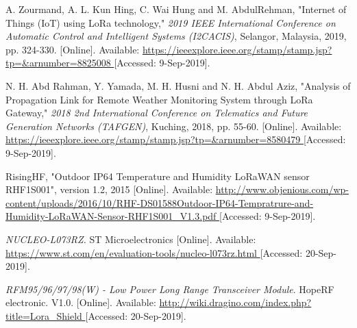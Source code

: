 \begin{thebibliography}{9}

A. Zourmand, A. L. Kun Hing, C. Wai Hung and M. AbdulRehman, "Internet of Things (IoT) using LoRa technology," \textit{2019 IEEE International Conference on Automatic Control and Intelligent Systems (I2CACIS)}, Selangor, Malaysia, 2019, pp. 324-330.
[Online]. Available:
\url{
https://ieeexplore.ieee.org/stamp/stamp.jsp?tp=&arnumber=8825008
}
[Accessed: 9-Sep-2019].


N. H. Abd Rahman, Y. Yamada, M. H. Husni and N. H. Abdul Aziz, "Analysis of Propagation Link for Remote Weather Monitoring System through LoRa Gateway," \textit{2018 2nd International Conference on Telematics and Future Generation Networks (TAFGEN)}, Kuching, 2018, pp. 55-60.
[Online]. Available:
\url{
https://ieeexplore.ieee.org/stamp/stamp.jsp?tp=&arnumber=8580479
}
[Accessed: 9-Sep-2019].




RisingHF, "Outdoor IP64 Temperature and Humidity LoRaWAN sensor RHF1S001", version 1.2, 2015
[Online]. Available:
\url{
http://www.objenious.com/wp-content/uploads/2016/10/RHF-DS01588Outdoor-IP64-Tempratrure-and-Humidity-LoRaWAN-Sensor-RHF1S001_V1.3.pdf
}
[Accessed: 9-Sep-2019].




\textit{
NUCLEO-L073RZ.
}
ST Microelectronics
[Online]. Available:
\url{
https://www.st.com/en/evaluation-tools/nucleo-l073rz.html
}
[Accessed: 20-Sep-2019].



\textit{
RFM95/96/97/98(W) - Low Power Long Range Transceiver Module}.
HopeRF electronic.
V1.0.
[Online]. Available:
\url{
http://wiki.dragino.com/index.php?title=Lora_Shield
}
[Accessed: 20-Sep-2019].




\end{thebibliography}
